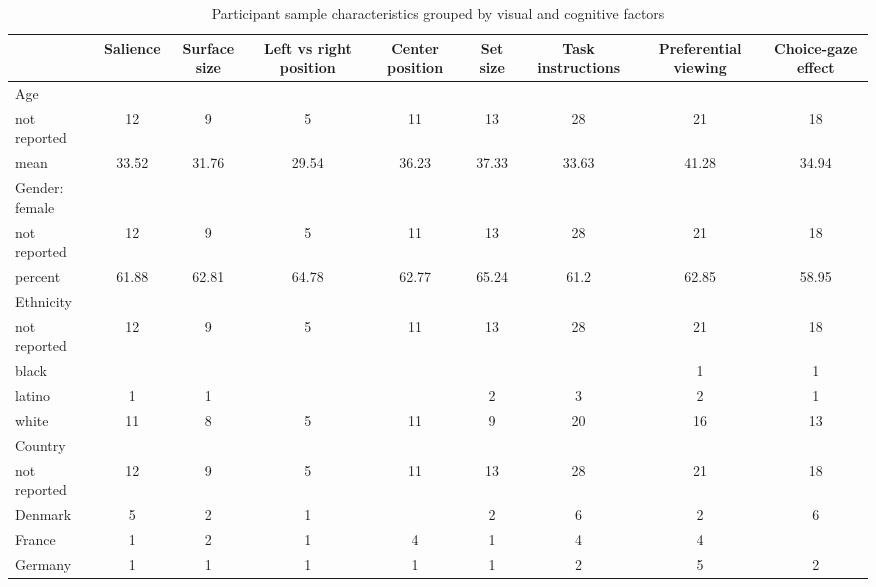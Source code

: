 \begin{table}[ht]
\centering
\caption{Participant sample characteristics grouped by visual and cognitive factors} 
\label{tab:sampleTable}
\begingroup\small
\begin{tabular}{lcccccccc}
  \hline
  & Salience & Surface size & Left vs right position & Center position & Set size & Task instructions & Preferential viewing & Choice-gaze effect \\ 
  \hline
Age &  &  &  &  &  &  &  &  \\ 
  \hspace{2mm}not reported & 12 & 9 & 5 & 11 & 13 & 28 & 21 & 18 \\ 
  \hspace{2mm}mean & 33.52 & 31.76 & 29.54 & 36.23 & 37.33 & 33.63 & 41.28 & 34.94 \\ 
  Gender: female &  &  &  &  &  &  &  &  \\ 
  \hspace{2mm}not reported & 12 & 9 & 5 & 11 & 13 & 28 & 21 & 18 \\ 
  \hspace{2mm}percent & 61.88 & 62.81 & 64.78 & 62.77 & 65.24 & 61.2 & 62.85 & 58.95 \\ 
  Ethnicity &  &  &  &  &  &  &  &  \\ 
  \hspace{2mm}not reported & 12 & 9 & 5 & 11 & 13 & 28 & 21 & 18 \\ 
  \hspace{2mm}black &  &  &  &  &  &  & 1 & 1 \\ 
  \hspace{2mm}latino & 1 & 1 &  &  & 2 & 3 & 2 & 1 \\ 
  \hspace{2mm}white & 11 & 8 & 5 & 11 & 9 & 20 & 16 & 13 \\ 
  Country &  &  &  &  &  &  &  &  \\ 
  \hspace{2mm}not reported & 12 & 9 & 5 & 11 & 13 & 28 & 21 & 18 \\ 
  \hspace{2mm}Denmark & 5 & 2 & 1 &  & 2 & 6 & 2 & 6 \\ 
  \hspace{2mm}France & 1 & 2 & 1 & 4 & 1 & 4 & 4 &  \\ 
  \hspace{2mm}Germany & 1 & 1 & 1 & 1 & 1 & 2 & 5 & 2 \\ 

\end{tabular}
\end{table}
